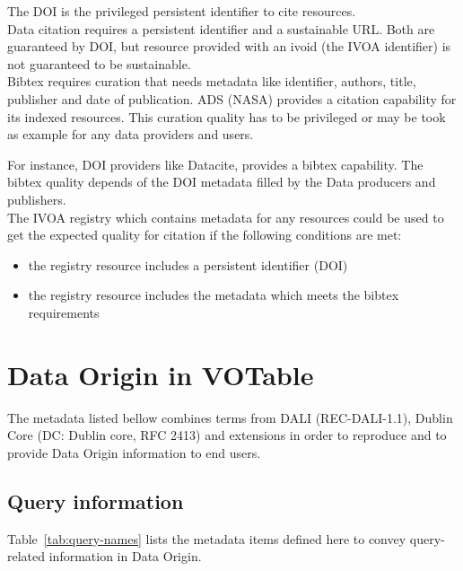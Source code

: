 \documentclass[11pt,a4paper]{ivoa}
\begin{document}
The DOI is the privileged persistent identifier to cite resources.\\

Data citation requires a persistent identifier and a sustainable URL.
Both are guaranteed by DOI, but resource provided with an ivoid (the IVOA identifier)
is not guaranteed to be sustainable.\\

Bibtex requires curation that needs metadata like identifier, authors, title, publisher and date of publication.
ADS (NASA) provides a citation capability for its indexed resources. This curation quality has to be privileged or may be took as example for any data providers and users.

For instance, DOI providers like Datacite, provides a bibtex capability. The bibtex quality depends of the DOI metadata filled by the Data producers and publishers.\\

The IVOA registry which contains metadata for any resources could be used to get the expected quality for citation if the following conditions are met:
\begin{itemize}
\item the registry resource includes a persistent identifier (DOI)
\item the registry resource includes the metadata which meets the bibtex requirements
\end{itemize}



\section{Data Origin in VOTable}
\label{sec:data-origin-in-votable}
The metadata listed bellow combines terms from DALI (REC-DALI-1.1), Dublin Core (DC: Dublin core, RFC 2413) and extensions in order to reproduce and to provide Data Origin information to end users.

\subsection{Query information}
Table~\ref{tab:query-names} lists the metadata items defined here to
convey query-related information in Data Origin.
\end{document}

